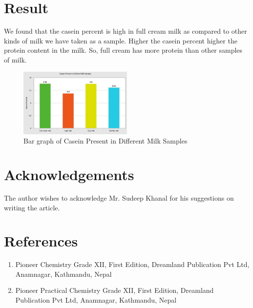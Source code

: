 \documentclass[aps, jcp, prb, two column, showpacs,groupedaddress,]{revtex4-2}
\begin{document}
\vspace{0.5cm}



\section{Result}

We found that the casein percent is high in full cream milk as compared to other kinds of milk we have taken as a sample. Higher the casein percent higher the protein content in the milk. So, full cream has more protein than other samples of milk.

\begin{figure}[h]
    \centering
    \includegraphics[width=0.5\textwidth]{bargraph.jpg}
    \caption{Bar graph of Casein Present in Different Milk Samples}
    \label{fig:my_figure}
\end{figure}

\section*{Acknowledgements}

The author wishes to acknowledge Mr. Sudeep Khanal for his suggestions on writing the article. 




\section*{References}

\begin{enumerate}
    \item Pioneer Chemistry Grade XII, First Edition, Dreamland Publication Pvt Ltd, Anamnagar, Kathmandu, Nepal  \vspace{-0.2cm}
    \item  Pioneer Practical Chemistry Grade XII, First Edition, Dreamland Publication Pvt Ltd, Anamnagar, Kathmandu, Nepal  \vspace{-0.2cm}
\end{enumerate}
\end{document}
